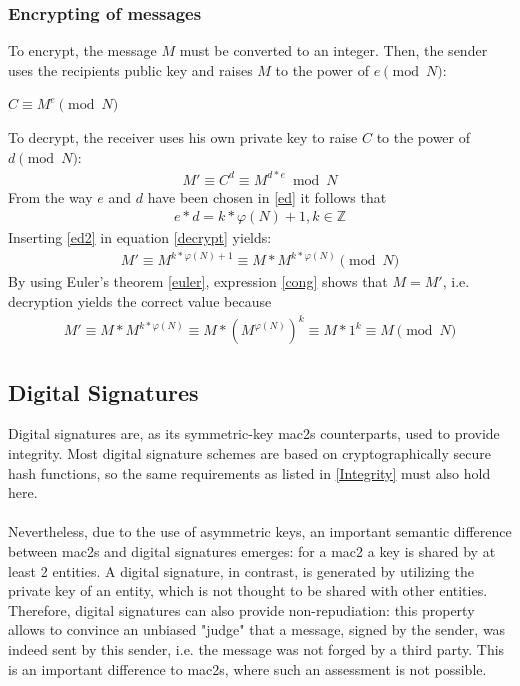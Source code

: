 \subsubsection{Encrypting of messages}

To encrypt, the message $M$ must be converted to an integer. Then, the sender uses the recipients public key and raises $M$ to the power of $e \pmod N$:
\begin{center}
 $C \equiv M^e \pmod N$
\end{center}
To decrypt, the receiver uses his own private key to raise $C$ to the power of $d \pmod N$:
\begin{align}\label{decrypt}
 M' \equiv C^d \equiv M^{d*e} \bmod N
\end{align}
From the way $e$ and $d$ have been chosen in \ref{ed} it follows that 
\begin{align}\label{ed2}
 e*d = k * \varphi(N) + 1, k \in \mathbb{Z} 
\end{align}
Inserting \ref{ed2} in equation \ref{decrypt} yields:
\begin{align}\label{cong}
  M' \equiv M^{k * \varphi(N) + 1} \equiv M* M^{k * \varphi(N)} \pmod N
\end{align}
By using Euler's theorem \ref{euler}, expression \ref{cong} shows that $M=M'$, i.e. decryption yields the correct value because
\begin{align*}
 M' \equiv M* M^{k * \varphi(N)} \equiv M* (M^{ \varphi(N)})^k \equiv M * 1^k \equiv M \pmod N
\end{align*} 

\subsection{Digital Signatures}\label{digitalSignatures}

Digital signatures are, as its symmetric-key \glspl{mac2} counterparts, used to provide integrity. Most digital signature schemes are based on
cryptographically secure hash functions, so the same requirements as listed in \ref{Integrity} must also hold here.
\\
\\
Nevertheless, due to the use of asymmetric keys, an important semantic difference between \glspl{mac2} and digital signatures emerges: for a \gls{mac2} 
a key is shared by at least 2 entities. A digital signature, in contrast, is generated by utilizing the private key of an entity, which is not thought to be shared with
other entities. Therefore, digital signatures can also provide non-repudiation:
this property allows to convince an unbiased "judge" that a message, signed by the sender, was indeed sent by this sender, i.e. the message was not
forged by a third party. This is an important difference to \glspl{mac2}, where such an assessment is not possible.

